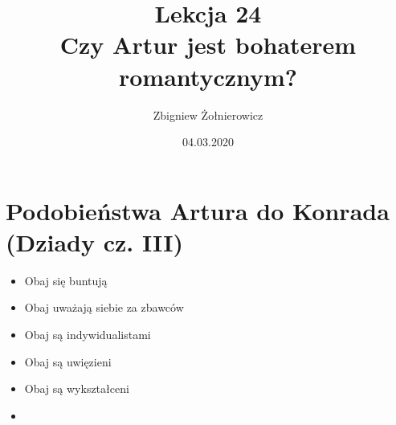 \documentclass[a4paper]{article}
\begin{document}
\title{{\huge Lekcja 24} \\
{\large Czy Artur jest bohaterem romantycznym?}}
\author{Zbigniew Żołnierowicz}
\date{04.03.2020}
\maketitle
\section{Podobieństwa Artura do Konrada (Dziady cz. III)}
\begin{itemize}
    \item Obaj się buntują
    \item Obaj uważają siebie za zbawców
    \item Obaj są indywidualistami
    \item Obaj są uwięzieni
    \item Obaj są wykształceni
    \item 
\end{itemize}
\end{document}
